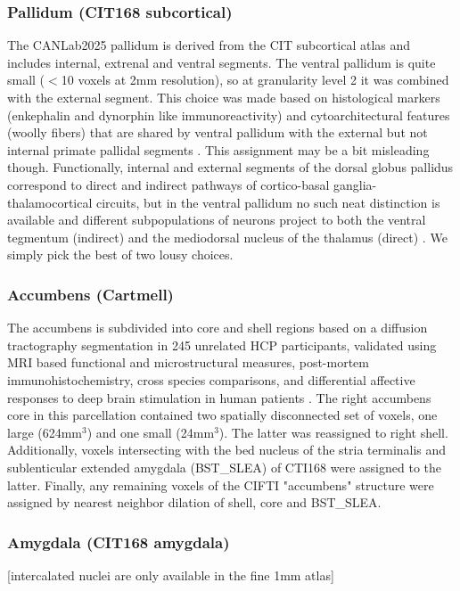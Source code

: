 \documentclass[10pt,letterpaper]{article}
\begin{document}
\subsubsection{Pallidum (CIT168 subcortical)} The CANLab2025 pallidum is derived from the CIT subcortical atlas and includes internal, extrenal and ventral segments. The ventral pallidum is quite small ($<$10 voxels at 2mm resolution), so at granularity level 2 it was combined with the external segment. This choice was made based on histological markers (enkephalin and dynorphin like immunoreactivity) and cytoarchitectural features (woolly fibers) that are shared by ventral pallidum with the external but not internal primate pallidal segments . This assignment may be a bit misleading though. Functionally, internal and external segments of the dorsal globus pallidus correspond to direct and indirect pathways of cortico-basal ganglia-thalamocortical circuits, but in the ventral pallidum no such neat distinction is available and different subpopulations of neurons project to both the ventral tegmentum (indirect) and the mediodorsal nucleus of the thalamus (direct) . We simply pick the best of two lousy choices.
\\
\subsubsection{Accumbens (Cartmell)} The accumbens is subdivided into core and shell regions based on a diffusion tractography segmentation in 245 unrelated HCP participants, validated using MRI based functional and microstructural measures, post-mortem immunohistochemistry, cross species comparisons, and differential affective responses to deep brain stimulation in human patients . The right accumbens core in this parcellation contained two spatially disconnected set of voxels, one large (624mm$^3$) and one small (24mm$^3$). The latter was reassigned to right shell. Additionally, voxels intersecting with the bed nucleus of the stria terminalis and sublenticular extended amygdala (BST\_SLEA) of CTI168  were assigned to the latter. Finally, any remaining voxels of the CIFTI "accumbens" structure were assigned by nearest neighbor dilation of shell, core and BST\_SLEA.
\\
\subsubsection{Amygdala (CIT168 amygdala)} [intercalated nuclei are only available in the fine 1mm atlas]
\\
\end{document}
